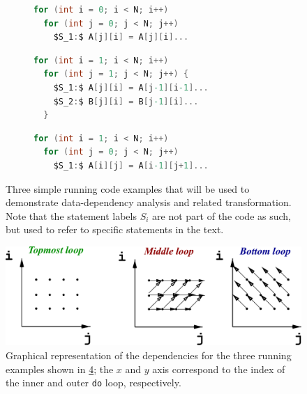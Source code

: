 \begin{figure}
  \centering

  \begin{subfigure}[b]{0.45\textwidth}
\begin{lstlisting}[language=C,mathescape=True]
for (int i = 0; i < N; i++)
  for (int j = 0; j < N; j++)
    $S_1:$ A[j][i] = A[j][i]...
\end{lstlisting}
    \caption{}
    \label{fig:data-dep-running-eg-a}
  \end{subfigure}

  \begin{subfigure}[b]{0.45\textwidth}
\begin{lstlisting}[language=C,mathescape=True]
for (int i = 1; i < N; i++)
  for (int j = 1; j < N; j++) {
    $S_1:$ A[j][i] = A[j-1][i-1]...
    $S_2:$ B[j][i] = B[j-1][i]...
  }
\end{lstlisting}
    \caption{}
    \label{fig:data-dep-running-eg-b}
  \end{subfigure}

  \begin{subfigure}[b]{0.45\textwidth}
\begin{lstlisting}[language=C,mathescape=True]
for (int i = 1; i < N; i++)
  for (int j = 0; j < N; j++)
    $S_1:$ A[i][j] = A[i-1][j+1]...
\end{lstlisting}
    \caption{}
    \label{fig:data-dep-running-eg-c}
  \end{subfigure}

  \caption{Three simple running code examples that will be used to
    demonstrate data-dependency analysis and related transformation.
    Note that the statement labels $S_{i}$ are not part of the code as
    such, but used to refer to specific statements in the text.}
  \label{fig:data-dep-running-eg}
\end{figure}

\begin{figure}
  \includegraphics[width=\textwidth]{img/LoopDeps.pdf}
  \caption{Graphical representation of the dependencies for the three running examples shown in \cref{fig:data-dep-running-eg}; the $x$ and $y$ axis correspond to the index of the inner and outer \lstinline{do} loop, respectively.}
  \label{fig:dep-graph}
\end{figure}

